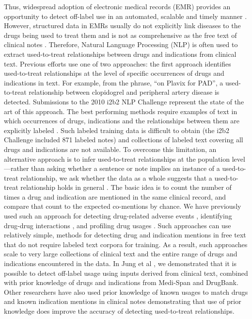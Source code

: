 Thus, widespread adoption of electronic medical records (EMR) provides
an opportunity to detect off-label use in an automated, scalable and
timely manner \cite{Morris2012}.  However, structured data in EMRs
usually do not explicitly link diseases to the drugs being used to
treat them \cite{Pan2012} and is not as comprehensive as the free text
of clinical notes \cite{Poissant2010}.  Therefore, Natural Language
Processing (NLP) is often used to extract used-to-treat relationships
between drugs and indications from clinical text.  Previous efforts
use one of two approaches: the first approach identifies used-to-treat
relationships at the level of specific occurrences of drugs and
indications in text.  For example, from the phrase, “on Plavix for
PAD”, a used-to-treat relationship between clopidogrel and peripheral
artery disease is detected.  Submissions to the 2010 i2b2 NLP
Challenge \cite{Uzuner2011} represent the state of the art of this
approach.  The best performing methods require examples of text in
which occurrences of drugs, indications and the relationships between
them are explicitly labeled \cite{Chapman2011}. Such labeled training
data is difficult to obtain (the i2b2 Challenge included 871 labeled
notes) and collections of labeled text covering all drugs and
indications are not available. To overcome this limitation, an
alternative approach is to infer used-to-treat relationships at the
population level—rather than asking whether a sentence or note implies
an instance of a used-to-treat relationship, we ask whether the data
as a whole suggests that a used-to-treat relationship holds in general
\cite{Chen2008,Rindflesch2005,Lependu2012}.  The basic idea is to
count the number of times a drug and indication are mentioned in the
same clinical record, and compare that count to the expected
co-mentions by chance.  We have previously used such an approach for
detecting drug-related adverse events \cite{Lependu2013}, identifying
drug-drug interactions \cite{Iyer2013}, and profiling drug usages
\cite{Lependu2012}.  Such approaches can use relatively simple,
methods for detecting drug and indication mentions in free text that
do not require labeled text corpora for training.  As a result, such
approaches scale to very large collections of clinical text and the
entire range of drugs and indications encountered in the data.  In
Jung et al \cite{Jung2013}, we demonstrated that it is possible to
detect off-label usage using inputs derived from clinical text,
combined with prior knowledge of drugs and indications from Medi-Span
and DrugBank.  Other researchers \cite{Li2011} have also used prior
knowledge of known usages to match drugs and known indication mentions
in clinical notes demonstrating that use of prior knowledge does
improve the accuracy of detecting used-to-treat relationships.

